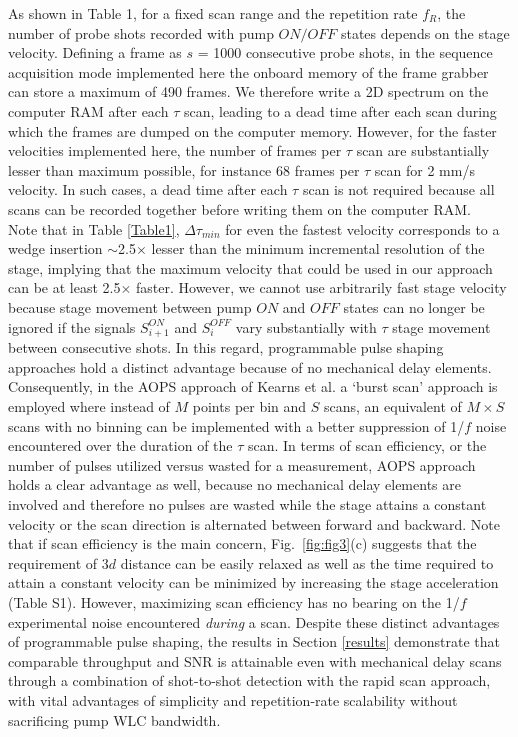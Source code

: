 \documentclass[%
aip,
amsmath,amssymb,
preprint,%
]{revtex4-2}
\begin{document}
As shown in Table 1, for a fixed scan range and the repetition rate $f_R$, the number of probe shots recorded with pump $ON/OFF$ states depends on the stage velocity. Defining a frame as $s$ = 1000 consecutive probe shots, in the sequence acquisition\cite{imaq} mode implemented here the onboard memory of the frame grabber can store a maximum of 490 frames. We therefore write a 2D spectrum on the computer RAM after each $\tau$ scan, leading to a dead time after each scan during which the frames are dumped on the computer memory. However, for the faster velocities implemented here, the number of frames per $\tau$ scan are substantially lesser than maximum possible, for instance 68 frames per $\tau$ scan for 2 mm/s velocity. In such cases, a dead time after each $\tau$ scan is not required because all scans can be recorded together before writing them on the computer RAM. \\

Note that in Table \ref{Table1}, $\Delta\tau_{min}$ for even the fastest velocity corresponds to a wedge insertion $\sim$2.5$\times$ lesser than the minimum incremental resolution of the stage, implying that the maximum velocity that could be used in our approach can be at least 2.5$\times$ faster. However, we cannot use arbitrarily fast stage velocity because stage movement between pump $ON$ and $OFF$ states can no longer be ignored if the signals $S_{i+1}^{ON}$ and $S_{i}^{OFF}$ vary substantially with $\tau$ stage movement between consecutive shots. In this regard, programmable pulse shaping approaches hold a distinct advantage because of no mechanical delay elements. Consequently, in the AOPS approach\cite{Kearns2017} of Kearns et al. a `burst scan' approach is employed where instead of $M$ points per bin and $S$ scans, an equivalent of $M \times S$ scans with no binning can be implemented with a better suppression of 1/$f$ noise encountered over the duration\cite{Moon1993} of the $\tau$ scan. In terms of scan efficiency\cite{Bhat2023}, or the number of pulses utilized versus wasted for a measurement, AOPS approach holds a clear advantage as well, because no mechanical delay elements are involved and therefore no pulses are wasted while the stage attains a constant velocity or the scan direction is alternated between forward and backward.  Note that if scan efficiency is the main concern, Fig.~\ref{fig:fig3}(c) suggests that the requirement of 3$d$ distance can be easily relaxed as well as the time required to attain a constant velocity can be minimized by increasing the stage acceleration (Table S1). However, maximizing scan efficiency has no bearing on the 1/$f$ experimental noise encountered \textit{during} a scan. Despite these distinct advantages of programmable pulse shaping, the results in Section \ref{results} demonstrate that comparable throughput and SNR is attainable even with mechanical delay scans through a combination of shot-to-shot detection with the rapid scan approach, with vital advantages of simplicity and repetition-rate scalability without sacrificing pump WLC bandwidth.
\end{document}
